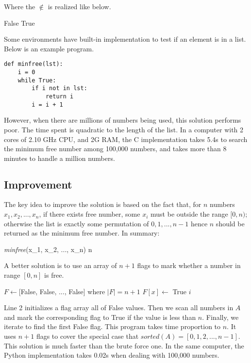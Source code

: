 \documentclass[b5paper]{article}
\begin{document}
Where the $\notin$ is realized like below.

\begin{algorithmic}[1]
      \State \Return False
    \EndIf
  \EndFor
  \State \Return True
\EndFunction
\end{algorithmic}

Some environments have built-in implementation to test if an element is in a list. Below is an example program.

\lstset{language=Python, frame=single}
\begin{lstlisting}
def minfree(lst):
    i = 0
    while True:
        if i not in lst:
            return i
        i = i + 1
\end{lstlisting}

However, when there are millions of numbers being used, this solution performs poor. The time spent is quadratic to the length of the list. In a computer with 2 cores of 2.10 GHz CPU, and 2G RAM, the C implementation takes 5.4s to search the minimum free number among 100,000 numbers, and takes more than 8 minutes to handle a million numbers.

\subsection{Improvement}
The key idea to improve the solution is based on the fact that, for $n$ numbers $x_1, x_2, ..., x_n$, if there exists free number, some $x_i$ must be outside the range $[0, n)$; otherwise the list is exactly some permutation of $0, 1, ..., n - 1$ hence $n$ should be returned as the minimum free number. In summary:

\be
\textit{minfree}(x_1, x_2, ..., x_n) \leq n
\label{min-free}
\ee

A better solution is to use an array of $n + 1$ flags to mark whether a number in range $[0, n]$ is free.

\begin{algorithmic}[1]
  \State $F \gets $[False, False, ..., False] where $|F| = n+1$
      \State $F[x] \gets$ True
    \EndIf
  \EndFor
      \State \Return $i$
    \EndIf
  \EndFor
\EndFunction
\end{algorithmic}

Line 2 initializes a flag array all of False values. Then we scan all numbers in $A$ and mark the corresponding flag to True if the value is less than $n$. Finally, we iterate to find the first False flag. This program takes time proportion to $n$. It uses $n + 1$ flags to cover the special case that $sorted(A) = [0, 1, 2, ..., n-1]$. This solution is much faster than the brute force one. In the same computer, the Python implementation takes 0.02s when dealing with 100,000 numbers.
\end{document}
